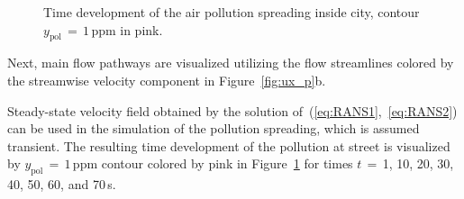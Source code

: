 \begin{figure}[htpb]
    \caption{Time development of the air pollution spreading inside city, contour $y_{\mathrm{pol}}\,=\,1\,$ppm in pink.}
    \label{fig:pol}
\end{figure}

Next, main flow pathways are visualized utilizing the flow streamlines colored by the streamwise velocity component in Figure~\ref{fig:ux_p}b.

Steady-state velocity field obtained by the solution of~(\ref{eq:RANS1},~\ref{eq:RANS2}) can be used in the simulation of the pollution spreading, which is assumed transient. The resulting time development of the pollution at street is visualized by $y_{\mathrm{pol}}\,=\,1\,$ppm contour colored by pink in Figure~\ref{fig:pol} for times $t\,=\,$1, 10, 20, 30, 40, 50, 60, and 70\,s.